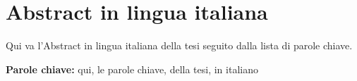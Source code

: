 \cleardoublepage

\section*{Abstract in lingua italiana}
Qui va l'Abstract in lingua italiana della tesi seguito dalla lista di parole chiave.
\vspace{15pt}
\begin{tcolorbox}[arc=0pt, boxrule=0pt, colback=bluePoli!60, width=\textwidth, colupper=white]
    \textbf{Parole chiave:} qui, le parole chiave, della tesi, in italiano 
\end{tcolorbox}

